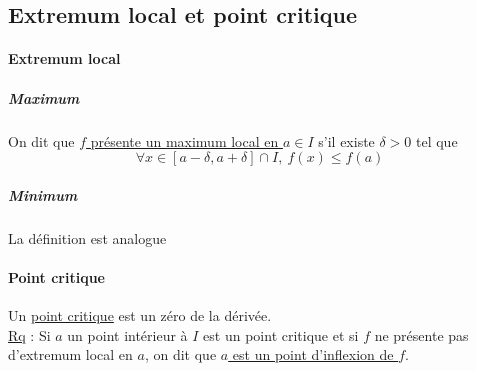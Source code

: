 \subsection{Extremum local et point critique}
    \traitd
    \paragraph{Extremum local}
        \subparagraph{Maximum} On dit que \uline{$f$ présente un maximum local en $a\in I$} s'il existe $\delta>0$ tel que 
        \[\forall x\in [a-\delta,a+\delta] \cap I ,~f(x)\leqslant f(a) \]
        \subparagraph{Minimum} La définition est analogue \trait ${}$ \vspace*{-1.5cm} \\ \traitd 
    \paragraph{Point critique}
        Un \uline{point critique} est un zéro de la dérivée. \trait
     \\
     \uline{Rq} : Si $a$ un point intérieur à $I$ est un point critique et si $f$ ne présente pas d'extremum local en $a$, on dit que \uline{$a$ est un point d'inflexion de $f$}. \\
